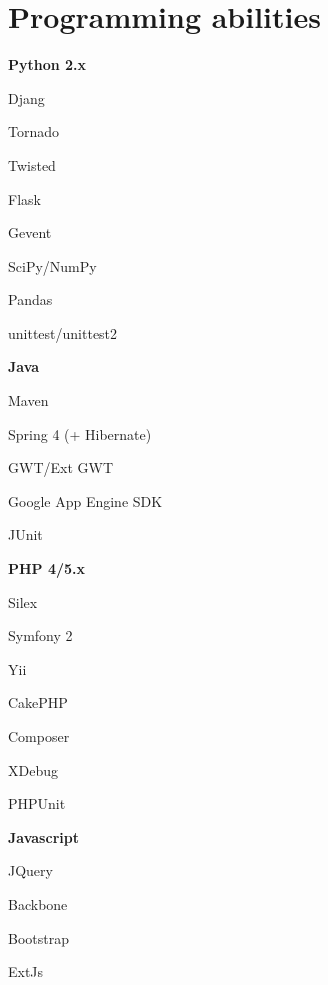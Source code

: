 \documentclass[10pt, a4paper, english]{article}
\begin{document}
\section* {Programming abilities}
  \begin{multicols}{3}
    \begin {list}{\textbullet}{}
      \item \textbf{Python 2.x}
        \begin {list}{\circ}{}
          \item Djang
          \item Tornado
          \item Twisted
          \item Flask
          \item Gevent
          \item SciPy/NumPy
          \item Pandas
          \item unittest/unittest2
        \end{list}
      \item \textbf{Java}
        \begin {list}{\circ}{}
          \item Maven
          \item Spring 4 (+ Hibernate)
          \item GWT/Ext GWT
          \item Google App Engine SDK
          \item JUnit
        \end{list}
      \columnbreak
      \item \textbf{PHP 4/5.x}
        \begin {list}{\circ}{}
          \item Silex
          \item Symfony 2
          \item Yii
          \item CakePHP
          \item Composer
          \item XDebug
          \item PHPUnit
        \end{list}
      \item \textbf{Javascript}
        \begin {list}{\circ}{}
          \item JQuery
          \item Backbone
          \item Bootstrap
          \item ExtJs

\end{list}
\end{list}
\end{multicols}
\end{document}
